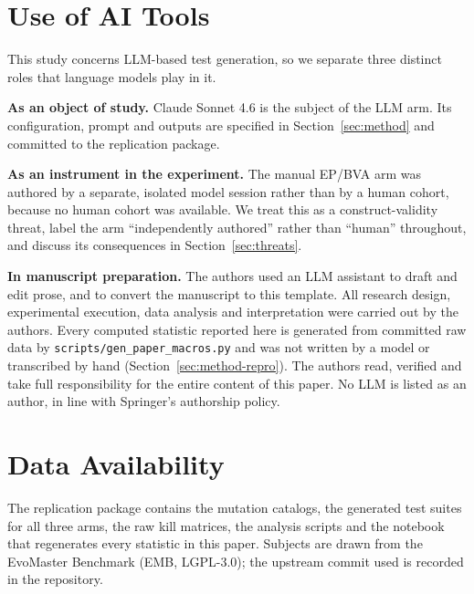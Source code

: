 
\section*{Use of AI Tools}
\label{sec:ai-disclosure}

This study concerns LLM-based test generation, so we separate three distinct roles that
language models play in it.

\textbf{As an object of study.} Claude Sonnet 4.6 is the subject of the LLM arm. Its
configuration, prompt and outputs are specified in Section~\ref{sec:method} and committed to
the replication package.

\textbf{As an instrument in the experiment.} The manual EP/BVA arm was authored by a separate,
isolated model session rather than by a human cohort, because no human cohort was available.
We treat this as a construct-validity threat, label the arm ``independently authored'' rather
than ``human'' throughout, and discuss its consequences in Section~\ref{sec:threats}.

\textbf{In manuscript preparation.} The authors used an LLM assistant to draft and edit prose,
and to convert the manuscript to this template. All research design, experimental execution,
data analysis and interpretation were carried out by the authors. Every computed statistic
reported here is generated from committed raw data by \texttt{scripts/gen\_paper\_macros.py}
and was not written by a model or transcribed by hand (Section~\ref{sec:method-repro}). The
authors read,
verified and take full responsibility for the entire content of this paper. No LLM is listed
as an author, in line with Springer's authorship policy.

\section*{Data Availability}

The replication package contains the mutation catalogs, the generated test suites for all
three arms, the raw kill matrices, the analysis scripts and the notebook that regenerates
every statistic in this paper. Subjects are drawn from the EvoMaster Benchmark (EMB,
LGPL-3.0); the upstream commit used is recorded in the repository.

